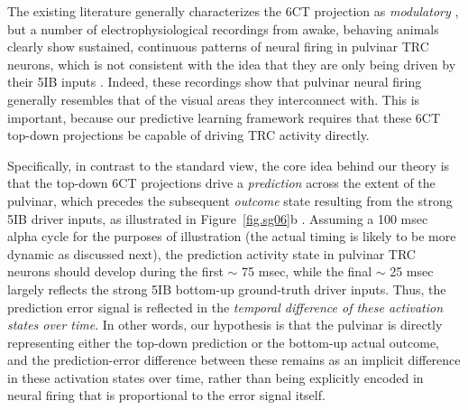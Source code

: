 \documentclass[11pt,twoside]{article}
\newif\myifpdf
\begin{document}
The existing literature generally characterizes the 6CT projection as \emph{modulatory} \citep{ShermanGuillery13,UsreySherman18}, but a number of electrophysiological recordings from awake, behaving animals clearly show sustained, continuous patterns of neural firing in pulvinar TRC neurons, which is not consistent with the idea that they are only being driven by their 5IB inputs \citep{Bender82,PetersenRobinsonKeys85,BenderYouakim01,Robinson93,SaalmannPinskWangEtAl12,KomuraNikkuniHirashimaEtAl13,ZhouSchaferDesimone16}.  Indeed, these recordings show that pulvinar neural firing generally resembles that of the visual areas they interconnect with.  This is important, because our predictive learning framework requires that these 6CT top-down projections be capable of driving TRC activity directly.

Specifically, in contrast to the standard view, the core idea behind our theory is that the top-down 6CT projections drive a \emph{prediction} across the extent of the pulvinar, which precedes the subsequent \emph{outcome} state resulting from the strong 5IB driver inputs, as illustrated in Figure~\ref{fig.sg06}b \citep{KachergisWyatteOReillyEtAl14,OReillyWyatteRohrlich14,OReillyWyatteRohrlich17}.  Assuming a 100 msec alpha cycle for the purposes of illustration (the actual timing is likely to be more dynamic as discussed next), the prediction activity state in pulvinar TRC neurons should develop during the first $\sim$ 75 msec, while the final $\sim$ 25 msec largely reflects the strong 5IB bottom-up ground-truth driver inputs.  Thus, the prediction error signal is reflected in the \emph{temporal difference of these activation states over time}.  In other words, our hypothesis is that the pulvinar is directly representing either the top-down prediction or the bottom-up actual outcome, and the prediction-error difference between these remains as an implicit difference in these activation states over time, rather than being explicitly encoded in neural firing that is proportional to the error signal itself.
\end{document}
